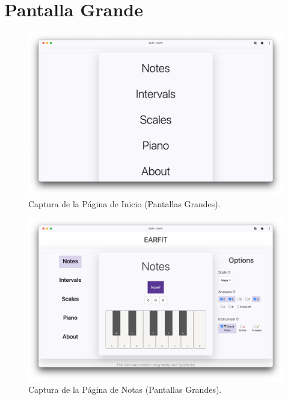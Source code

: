 \documentclass[12pt,twoside,titlepage]{report}
\begin{document}
\section{Pantalla Grande}

\begin{figure}[H]
    \centering
    \includegraphics[scale=0.28]{Capturas Earfit/PC/Menu}
    \caption{Captura de la Página de Inicio (Pantallas Grandes).}
    \label{fig:PCMenu}
\end{figure}

\begin{figure}[H]
    \centering
    \includegraphics[scale=0.28]{Capturas Earfit/PC/Notes}
    \caption{Captura de la Página de Notas (Pantallas Grandes).}
    \label{fig:PCNotes}
\end{figure}
\end{document}
